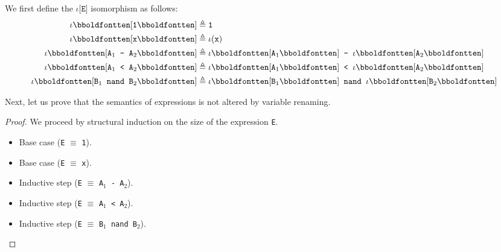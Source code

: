 \documentclass[10pt,justified,nofonts]{tufte-handout}
\begin{document}
%
\begin{answer}
  We first define the $\iota\mathbb{[}\texttt{E}\mathbb{]}$
  isomorphism as follows:
  \begin{align*}
    \iota\mathbb{[}\texttt{1}\mathbb{]} &\isDefAs \texttt{1}\\
    \iota\mathbb{[}\texttt{x}\mathbb{]} &\isDefAs \iota(\texttt{x})\\
    \iota\mathbb{[}\texttt{A}_1\texttt{ - }\texttt{A}_2\mathbb{]} &\isDefAs \iota\mathbb{[}\texttt{A}_1\mathbb{]}\texttt{ - }\iota\mathbb{[}\texttt{A}_2\mathbb{]}\\
    \iota\mathbb{[}\texttt{A}_1\texttt{ < }\texttt{A}_2\mathbb{]} &\isDefAs \iota\mathbb{[}\texttt{A}_1\mathbb{]}\texttt{ < }\iota\mathbb{[}\texttt{A}_2\mathbb{]}\\
    \iota\mathbb{[}\texttt{B}_1\texttt{ nand }\texttt{B}_2\mathbb{]} &\isDefAs \iota\mathbb{[}\texttt{B}_1\mathbb{]}\texttt{ nand }\iota\mathbb{[}\texttt{B}_2\mathbb{]}
  \end{align*}
  
  Next, let us prove that the semantics of expressions is not altered by
  variable renaming.
  \begin{proof}
    We proceed by structural induction on the size of the expression \texttt{E}.
    \begin{itemize}
    \item Base case (\texttt{E} $\equiv$ \texttt{1}).
    \item Base case (\texttt{E} $\equiv$ \texttt{x}).
    \item Inductive step (\texttt{E} $\equiv$ \texttt{A}$_1$\texttt{ - A}$_2$).
    \item Inductive step (\texttt{E} $\equiv$ \texttt{A}$_1$\texttt{ < A}$_2$).
    \item Inductive step (\texttt{E} $\equiv$ \texttt{B}$_1$\texttt{ nand B}$_2$).
    \end{itemize}
  \end{proof}
\end{answer}
%


\end{document}

